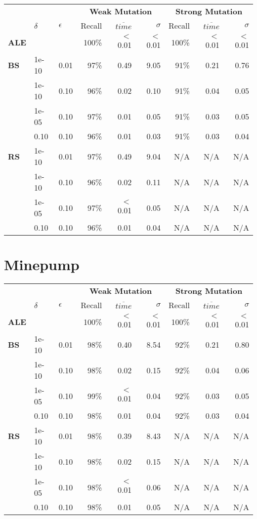 \begin{small} 
\begin{tabular}{lll|r|r|r|r|r|r} 
 & & & \multicolumn{3}{c|}{\textbf{Weak Mutation}} & \multicolumn{3}{c}{\textbf{Strong Mutation}}\\ 
 & $\delta$ & $\epsilon$ & Recall & $\overline{time}$ & $\sigma$ & Recall & $\overline{time}$ & $\sigma$ \\  
\hline 
\textbf{ALE} & & & 100\% & $<$0.01  & $<$0.01  & 100\% & $<$0.01  & $<$0.01  \\ 
\textbf{BS}  & 1e-10  & 0.01  & 97\% & 0.49  & 9.05  & 91\% & 0.21  & 0.76\\
 & 1e-10  & 0.10  & 96\% & 0.02  & 0.10  & 91\% & 0.04  & 0.05\\
 & 1e-05  & 0.10  & 97\% & 0.01  & 0.05  & 91\% & 0.03  & 0.05\\
 & 0.10  & 0.10  & 96\% & 0.01  & 0.03  & 91\% & 0.03  & 0.04\\
\textbf{RS}  & 1e-10  & 0.01  & 97\% & 0.49  & 9.04 & N/A & N/A & N/A \\
 & 1e-10  & 0.10  & 96\% & 0.02  & 0.11 & N/A & N/A & N/A \\
 & 1e-05  & 0.10  & 97\% & $<$0.01  & 0.05 & N/A & N/A & N/A \\
 & 0.10  & 0.10  & 96\% & 0.01  & 0.04 & N/A & N/A & N/A \\
\end{tabular} 
\end{small} 


\section{Minepump}

\begin{small} 
\begin{tabular}{lll|r|r|r|r|r|r} 
 & & & \multicolumn{3}{c|}{\textbf{Weak Mutation}} & \multicolumn{3}{c}{\textbf{Strong Mutation}}\\ 
 & $\delta$ & $\epsilon$ & Recall & $\overline{time}$ & $\sigma$ & Recall & $\overline{time}$ & $\sigma$ \\  
\hline 
\textbf{ALE} & & & 100\% & $<$0.01  & $<$0.01  & 100\% & $<$0.01  & $<$0.01  \\ 
\textbf{BS}  & 1e-10  & 0.01  & 98\% & 0.40  & 8.54  & 92\% & 0.21  & 0.80\\
 & 1e-10  & 0.10  & 98\% & 0.02  & 0.15  & 92\% & 0.04  & 0.06\\
 & 1e-05  & 0.10  & 99\% & $<$0.01  & 0.04  & 92\% & 0.03  & 0.05\\
 & 0.10  & 0.10  & 98\% & 0.01  & 0.04  & 92\% & 0.03  & 0.04\\
\textbf{RS}  & 1e-10  & 0.01  & 98\% & 0.39  & 8.43 & N/A & N/A & N/A \\
 & 1e-10  & 0.10  & 98\% & 0.02  & 0.15 & N/A & N/A & N/A \\
 & 1e-05  & 0.10  & 98\% & $<$0.01  & 0.06 & N/A & N/A & N/A \\
 & 0.10  & 0.10  & 98\% & 0.01  & 0.05 & N/A & N/A & N/A \\
\end{tabular} 
\end{small}  


